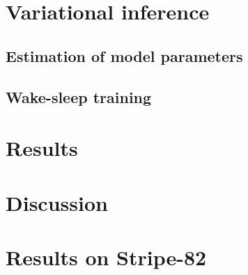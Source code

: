\documentclass[12pt]{article}
\begin{document}
\section{Variational inference}
\label{sec:var_inference}


\subsection{Estimation of model parameters}
\label{sec:model_params}


\subsection{Wake-sleep training}
\label{sec:wake_sleep}


% 

\section{Results}
\label{sec:results}




\section{Discussion}
\label{sec:discussion}





\appendix
\section{Results on Stripe-82}

\end{document}
